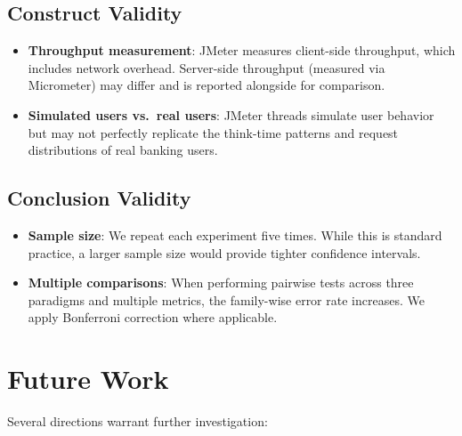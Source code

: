 \documentclass[journal]{IEEEtran}
\begin{document}
\subsection{Construct Validity}
\label{subsec:construct_validity}

\begin{itemize}
    \item \textbf{Throughput measurement}: JMeter measures client-side throughput, which includes network overhead. Server-side throughput (measured via Micrometer) may differ and is reported alongside for comparison.
    \item \textbf{Simulated users vs.\ real users}: JMeter threads simulate user behavior but may not perfectly replicate the think-time patterns and request distributions of real banking users.
\end{itemize}

\subsection{Conclusion Validity}
\label{subsec:conclusion_validity}

\begin{itemize}
    \item \textbf{Sample size}: We repeat each experiment five times. While this is standard practice, a larger sample size would provide tighter confidence intervals.
    \item \textbf{Multiple comparisons}: When performing pairwise tests across three paradigms and multiple metrics, the family-wise error rate increases. We apply Bonferroni correction where applicable.
\end{itemize}


\section{Future Work}
\label{sec:future_work}

Several directions warrant further investigation:
\end{document}
